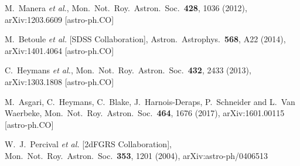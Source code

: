 \documentclass[superscriptaddress,oneolumn,secnumarabic,
amssymb,amsmath,nobibnotes,aps,prd,showpacs,nofootinbib]{revtex4}%
\begin{document}
\begin{thebibliography}{*}
  M.~Manera {\it et al.},
  Mon.\ Not.\ Roy.\ Astron.\ Soc.\  {\bf 428}, 1036 (2012),
  arXiv:1203.6609 [astro-ph.CO]


  M.~Betoule {\it et al.} [SDSS Collaboration],
  Astron.\ Astrophys.\  {\bf 568}, A22 (2014),
  arXiv:1401.4064 [astro-ph.CO]

  C.~Heymans {\it et al.},
  Mon.\ Not.\ Roy.\ Astron.\ Soc.\  {\bf 432}, 2433 (2013),
  arXiv:1303.1808 [astro-ph.CO]


  M.~Asgari, C.~Heymans, C.~Blake, J.~Harnois-Deraps, P.~Schneider and L.~Van Waerbeke,
  Mon.\ Not.\ Roy.\ Astron.\ Soc.\  {\bf 464}, 1676 (2017),
  arXiv:1601.00115 [astro-ph.CO]

  W.~J.~Percival {\it et al.} [2dFGRS Collaboration],
  Mon.\ Not.\ Roy.\ Astron.\ Soc.\  {\bf 353}, 1201 (2004),
  arXiv:astro-ph/0406513


\end{thebibliography}
\end{document}
